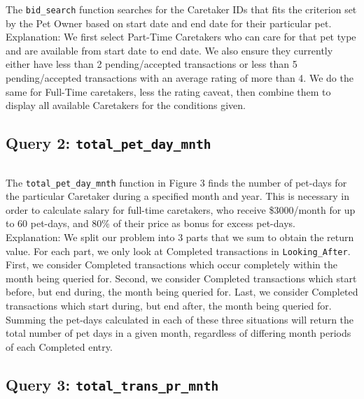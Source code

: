 \documentclass[10pt]{article}
\begin{document}
The \texttt{bid\_search} function searches for the Caretaker IDs that fits the criterion set by the Pet Owner based on start date and end date for their particular pet. \\

Explanation: We first select Part-Time Caretakers who can care for that pet type and are available from start date to end date. We also ensure they currently either have less than 2 pending/accepted transactions or less than 5 pending/accepted transactions with an average rating of more than 4. We do the same for Full-Time caretakers, less the rating caveat, then combine them to display all available Caretakers for the conditions given.

\subsection{Query 2: \texttt{total\_pet\_day\_mnth}}
\begin{figure}[H]
\inputminted[breaklines, tabsize=8, obeytabs, fontsize=\footnotesize]{postgresql}{./codes/query_total_pet_day_mnth.sql}
\end{figure}

The \texttt{total\_pet\_day\_mnth} function in Figure 3 finds the number of pet-days for the particular Caretaker during a specified month and year. This is necessary in order to calculate salary for full-time caretakers, who receive \$3000/month for up to 60 pet-days, and 80\% of their price as bonus for excess pet-days. \\

Explanation: We split our problem into 3 parts that we sum to obtain the return value. For each part, we only look at Completed transactions in \texttt{Looking\_After}. First, we consider Completed transactions which occur completely within the month being queried for. Second, we consider Completed transactions which start before, but end during, the month being queried for. Last, we consider Completed transactions which start during, but end after, the month being queried for. Summing the pet-days calculated in each of these three situations will return the total number of pet days in a given month, regardless of differing month periods of each Completed entry.

\subsection{Query 3: \texttt{total\_trans\_pr\_mnth}}
\begin{figure}[H]
\inputminted[breaklines, tabsize=8, obeytabs, fontsize=\footnotesize]{postgresql}{./codes/query_total_trans_pr_mnth.sql}
\end{figure}
\end{document}
